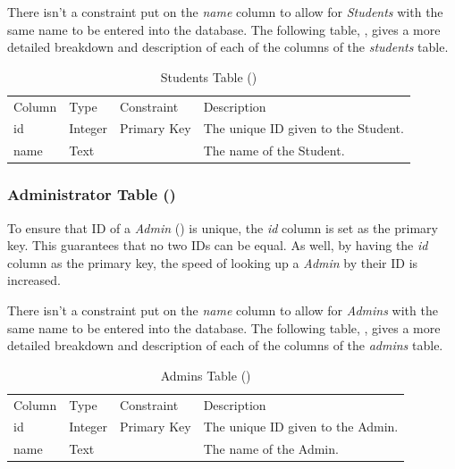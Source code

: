 \documentclass[12pt,letterpaper]{article}
\begin{document}
There isn't a constraint put on the \textit{name} column to allow for \textit{Students} with the same name to be entered into the database. The following table, , gives a more detailed breakdown and description of each of the columns of the \textit{students} table.

\begin{table}[H]
	\caption{Students Table ()} 
	\begin{tabu} to \textwidth {l l l X}
		\tableheader{}Column & Type & Constraint & Description \\
		id   & Integer & Primary Key & The unique ID given to the Student. \\
		name & Text    &             & The name of the Student. \\
	\end{tabu}
\end{table}

\subsubsection*{Administrator Table ()}
To ensure that ID of a \textit{Admin} () is unique, the \textit{id} column is set as the primary key. This guarantees that no two IDs can be equal. As well, by having the \textit{id} column as the primary key, the speed of looking up a \textit{Admin} by their ID is increased.

There isn't a constraint put on the \textit{name} column to allow for \textit{Admins} with the same name to be entered into the database. The following table, , gives a more detailed breakdown and description of each of the columns of the \textit{admins} table.

\begin{table}[H]
	\caption{Admins Table ()} 
	\begin{tabu} to \textwidth {l l l X}
		\tableheader{}Column & Type & Constraint & Description \\
		id   & Integer & Primary Key & The unique ID given to the Admin. \\
		name & Text    &             & The name of the Admin. \\
	\end{tabu}
\end{table}
\end{document}
